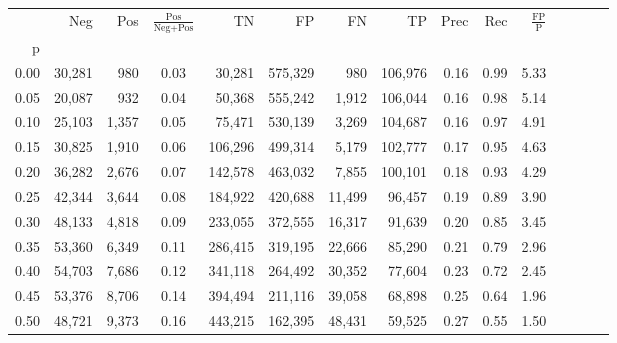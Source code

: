 \begin{tabular}{rrrcrrrrrrrrrrr}
\toprule
{} &     Neg &    Pos & $\frac{\text{Pos}}{\text{Neg}+\text{Pos}}$ &       TN &       FP &       FN &       TP &  Prec &   Rec & $\frac{\text{FP}}{\text{P}}$ \\
p    &         &        &                                            &          &          &          &          &       &       &                              \\
\midrule
0.00 &  30,281 &    980 &                                       0.03 &   30,281 &  575,329 &      980 &  106,976 &  0.16 &  0.99 &                         5.33 \\
0.05 &  20,087 &    932 &                                       0.04 &   50,368 &  555,242 &    1,912 &  106,044 &  0.16 &  0.98 &                         5.14 \\
0.10 &  25,103 &  1,357 &                                       0.05 &   75,471 &  530,139 &    3,269 &  104,687 &  0.16 &  0.97 &                         4.91 \\
0.15 &  30,825 &  1,910 &                                       0.06 &  106,296 &  499,314 &    5,179 &  102,777 &  0.17 &  0.95 &                         4.63 \\
0.20 &  36,282 &  2,676 &                                       0.07 &  142,578 &  463,032 &    7,855 &  100,101 &  0.18 &  0.93 &                         4.29 \\
0.25 &  42,344 &  3,644 &                                       0.08 &  184,922 &  420,688 &   11,499 &   96,457 &  0.19 &  0.89 &                         3.90 \\
0.30 &  48,133 &  4,818 &                                       0.09 &  233,055 &  372,555 &   16,317 &   91,639 &  0.20 &  0.85 &                         3.45 \\
0.35 &  53,360 &  6,349 &                                       0.11 &  286,415 &  319,195 &   22,666 &   85,290 &  0.21 &  0.79 &                         2.96 \\
0.40 &  54,703 &  7,686 &                                       0.12 &  341,118 &  264,492 &   30,352 &   77,604 &  0.23 &  0.72 &                         2.45 \\
0.45 &  53,376 &  8,706 &                                       0.14 &  394,494 &  211,116 &   39,058 &   68,898 &  0.25 &  0.64 &                         1.96 \\
0.50 &  48,721 &  9,373 &                                       0.16 &  443,215 &  162,395 &   48,431 &   59,525 &  0.27 &  0.55 &                         1.50 \\

\end{tabular}
